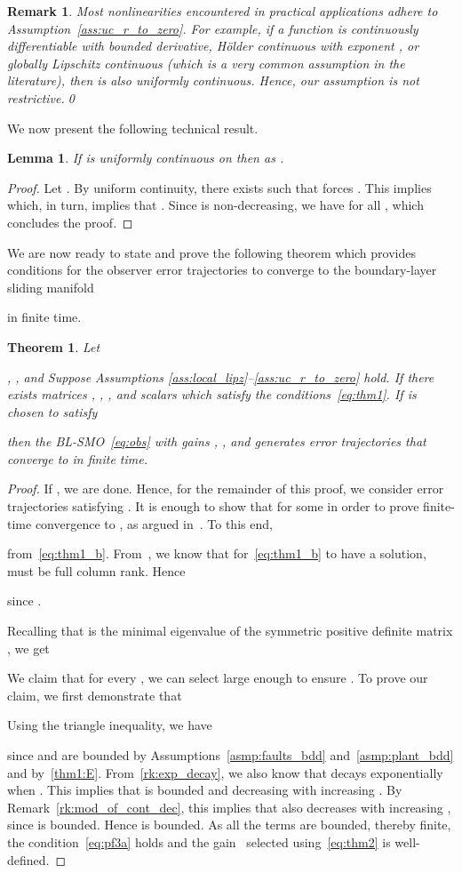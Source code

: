 \documentclass[times, doublespace]{rncauth}
\newtheorem{theorem}{Theorem}
\newtheorem{lemma}{Lemma}
\newtheorem{remark}{Remark}
\begin{document}
\begin{remark}\label{rk:unif_cont}
	Most nonlinearities encountered in practical applications adhere to Assumption~\ref{ass:uc_r_to_zero}.
	For example, if a function  is continuously differentiable with bounded derivative, H\"older continuous with exponent , or globally Lipschitz continuous (which is a very common assumption in the literature), then  is also uniformly continuous. Hence, our assumption is not restrictive.\qed
	\end{remark}
We now present the following technical result.
\begin{lemma}\label{lem:4}
	If  is uniformly continuous on  then  as .
\end{lemma}
\begin{proof}
	Let . By uniform continuity, there exists  such that  forces . This implies  which, in turn, implies that . Since  is non-decreasing, we have  for all , which concludes the proof.
\end{proof}


We are now ready to state and prove the following theorem which provides conditions for the observer error trajectories to converge to the boundary-layer sliding manifold

in finite time.
\begin{theorem}\label{thm2}
	Let 
	 
	, , and
	 Suppose Assumptions \ref{ass:local_lipz}--\ref{ass:uc_r_to_zero} hold. If there exists matrices , , ,  and scalars  which satisfy the conditions~\eqref{eq:thm1}. If  is chosen to satisfy
	
	then the BL-SMO~\eqref{eq:obs} with gains , ,  and  generates error trajectories  that converge to  in finite time.
\end{theorem}
\begin{proof}
	If , we are done. Hence, for the remainder of this proof, we consider error trajectories satisfying . It is enough to show that  for some  in order to prove finite-time convergence to , as argued in~\cite{Slotine1991}. To this end,
	
	from~\eqref{eq:thm1_b}. From~\cite{Zhu2014}, we know that for~\eqref{eq:thm1_b} to have a solution,  must be full column rank. Hence 
	 
	since .
	
	Recalling that  is the minimal eigenvalue of the symmetric positive definite matrix , we get
	
	We claim that for every , we can select  large enough to ensure . To prove our claim, we first demonstrate that
	
	Using the triangle inequality, we have
	
	since  and  are bounded by Assumptions~\ref{asmp:faults_bdd} and~\ref{asmp:plant_bdd} and by~\eqref{thm1:E}. 
From~\eqref{rk:exp_decay}, we also know that  decays exponentially when . This implies that  is bounded and decreasing with increasing . By Remark~\ref{rk:mod_of_cont_dec}, this implies that  also decreases with increasing , since  is bounded. Hence  is bounded. As all the terms are bounded, thereby finite, the condition~\eqref{eq:pf3a} holds and the gain~ selected using~\eqref{eq:thm2} is well-defined.
\end{proof}
\end{document}
